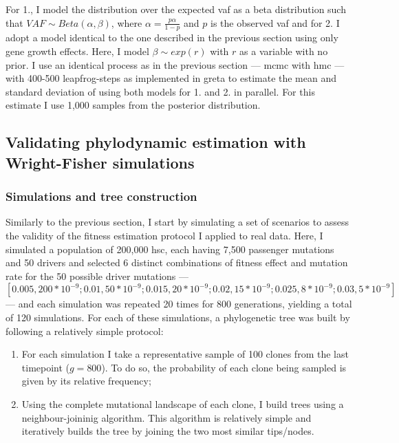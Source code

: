 For 1., I model the distribution over the expected \ac{vaf} as a beta distribution such that $VAF \sim Beta(\alpha,\beta)$, where $\alpha=\frac{p\alpha}{1-p}$ and $p$ is the observed \ac{vaf} and for 2. I adopt a model identical to the one described in the previous section using only gene growth effects. Here, I model $\beta \sim exp(r)$ with $r$ as a variable with no prior. I use an identical process as in the previous section --- \ac{mcmc} with \ac{hmc} --- with 400-500 leapfrog-steps as implemented in greta \cite{Golding2019-wh} to estimate the mean and standard deviation of  using both models for 1. and 2. in parallel. For this estimate I use 1,000 samples from the posterior distribution.

\subsection{Validating phylodynamic estimation with Wright-Fisher simulations}

\subsubsection{Simulations and tree construction}

Similarly to the previous section, I start by simulating a set of scenarios to assess the validity of the fitness estimation protocol I applied to real data. Here, I simulated a population of 200,000 \ac{hsc}, each having 7,500 passenger mutations and 50 drivers and selected 6 distinct combinations of fitness effect and mutation rate for the 50 possible driver mutations --- $[0.005,200*10^{-9}; 0.01,50*10^{-9}; 0.015,20*10^{-9}; 0.02,15*10^{-9}; 0.025,8*10^{-9}; 0.03,5*10^{-9}]$ --- and each simulation was repeated 20 times for 800 generations, yielding a total of 120 simulations. For each of these simulations, a phylogenetic tree was built by following a relatively simple protocol:

\begin{enumerate}
    \item For each simulation I take a representative sample of 100 clones from the last timepoint ($g = 800$). To do so, the probability of each clone being sampled is given by its relative frequency;
    \item Using the complete mutational landscape of each clone, I build trees using a neighbour-joininig algorithm. This algorithm is relatively simple and iteratively builds the tree by joining the two most similar tips/nodes. 
\end{enumerate}

